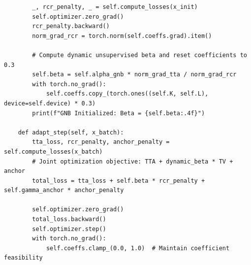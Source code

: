 \documentclass{article}
\theoremstyle{plain}
\theoremstyle{definition}
\theoremstyle{remark}
\begin{document}
\begin{small}
\begin{verbatim}
        _, rcr_penalty, _ = self.compute_losses(x_init)
        self.optimizer.zero_grad()
        rcr_penalty.backward()
        norm_grad_rcr = torch.norm(self.coeffs.grad).item()
        
        # Compute dynamic unsupervised beta and reset coefficients to 0.3
        self.beta = self.alpha_gnb * norm_grad_tta / norm_grad_rcr
        with torch.no_grad():
            self.coeffs.copy_(torch.ones((self.K, self.L), device=self.device) * 0.3)
        print(f"GNB Initialized: Beta = {self.beta:.4f}")

    def adapt_step(self, x_batch):
        tta_loss, rcr_penalty, anchor_penalty = self.compute_losses(x_batch)
        # Joint optimization objective: TTA + dynamic_beta * TV + anchor
        total_loss = tta_loss + self.beta * rcr_penalty + self.gamma_anchor * anchor_penalty
        
        self.optimizer.zero_grad()
        total_loss.backward()
        self.optimizer.step()
        with torch.no_grad():
            self.coeffs.clamp_(0.0, 1.0)  # Maintain coefficient feasibility
\end{verbatim}
\end{small}

\end{document}
